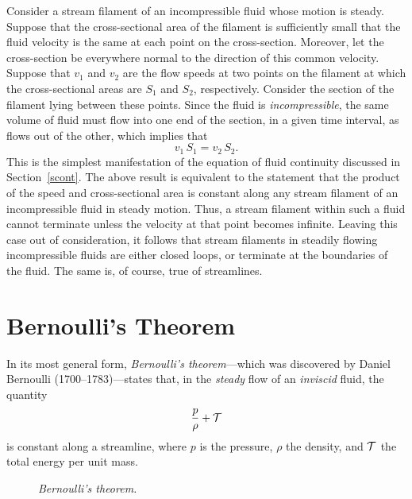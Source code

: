 Consider a stream filament of an incompressible fluid whose motion is steady. Suppose that the cross-sectional area of the
filament is  sufficiently small that the fluid velocity is the same at  each point on the
cross-section. Moreover, let the cross-section be  everywhere normal to the direction of this common velocity. 
Suppose that $v_1$ and $v_2$ are the flow speeds at two points on the filament at which the cross-sectional
areas are $S_1$ and $S_2$, respectively. Consider the section of the filament lying between these points.
Since the fluid is {\em incompressible},  the same
volume of fluid must flow into one end of the section, in a given time interval, as flows out of the other, which implies that
\begin{equation}
v_1\,S_1=v_2\,S_2.
\end{equation}
This is the simplest manifestation of the equation of fluid continuity discussed in Section~\ref{scont}. 
The above result is equivalent to the statement  that the product of the
speed and cross-sectional area is constant along any stream filament of an incompressible fluid in steady motion.
Thus, a stream filament within such a fluid cannot terminate unless the velocity at that
point becomes infinite. Leaving this case out of consideration, it follows that stream filaments
in steadily flowing incompressible fluids are either closed loops, or terminate at the boundaries of the fluid. 
The same is, of course, true of streamlines. 

\section{Bernoulli's Theorem}\label{sqbern}
In its most general form, {\em Bernoulli's theorem}---which was discovered by Daniel Bernoulli (1700--1783)---states that, in the {\em steady}\/ flow of an {\em inviscid}\/ fluid, the quantity
\begin{equation}
\frac{p}{\rho} + {\cal T}
\end{equation}
is constant along a streamline, where $p$ is the pressure, $\rho$ the density, and ${\cal T}$
the total energy per unit mass.

\begin{figure}
\epsfysize=2.75in
\centerline{}
\caption{\em Bernoulli's theorem.}\label{fbern}
\end{figure}

